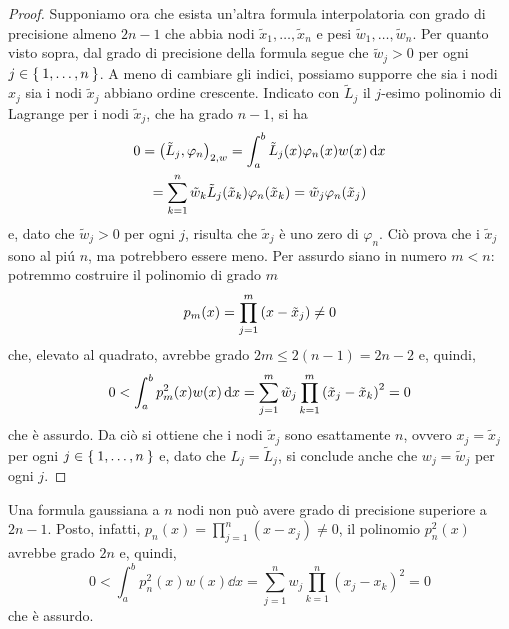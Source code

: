 \begin{proof}
		Supponiamo ora che esista un'altra formula interpolatoria con grado di precisione almeno \(2 n - 1\) che abbia nodi \(\tilde{x}_1, \dots, \tilde{x}_n\) e pesi \(\tilde{w}_1, \dots, \tilde{w}_n\). Per quanto visto sopra, dal grado di precisione della formula segue che \(\tilde{w}_j > 0\) per ogni \(j \in \Set{1, \dots, n}\). A meno di cambiare gli indici, possiamo supporre che sia i nodi \(x_j\) sia i nodi \(\tilde{x}_j\) abbiano ordine crescente. Indicato con \(\tilde{L}_j\) il \(j\)-esimo polinomio di Lagrange per i nodi \(\tilde{x}_j\), che ha grado \(n - 1\), si ha
		\begin{multline*}
				0 = \qty(\tilde{L}_j, \varphi_n)_{2, w} = \int_a^b \tilde{L}_j (x) \varphi_n (x) w (x) \dd{x} \\
				= \sum_{k = 1}^n \tilde{w}_k \tilde{L}_j (\tilde{x}_k) \varphi_n (\tilde{x}_k) = \tilde{w}_j \varphi_n (\tilde{x}_j)
		\end{multline*}
		e, dato che \(\tilde{w}_j > 0\) per ogni \(j\), risulta che \(\tilde{x}_j\) è uno zero di \(\varphi_n\). Ciò prova che i \(\tilde{x}_j\) sono al piú \(n\), ma potrebbero essere meno. Per assurdo siano in numero \(m < n\): potremmo costruire il polinomio di grado \(m\)
		\begin{equation*}
			p_m (x) = \prod_{j = 1}^m \qty(x - \tilde{x}_j) \ne 0
		\end{equation*}
		che, elevato al quadrato, avrebbe grado \(2 m \le 2 (n - 1) = 2 n - 2\) e, quindi,
		\begin{equation*}
			0 < \int_a^b p_m^2 (x) w (x) \dd{x} = \sum_{j = 1}^m \tilde{w}_j \prod_{k = 1}^m \qty(\tilde{x}_j - \tilde{x}_k)^2 = 0
		\end{equation*}
		che è assurdo. Da ciò si ottiene che i nodi \(\tilde{x}_j\) sono esattamente \(n\), ovvero \(x_j = \tilde{x}_j\) per ogni \(j \in \Set{1, \dots, n}\) e, dato che \(L_j = \tilde{L}_j\), si conclude anche che \(w_j = \tilde{w}_j\) per ogni \(j\).
	\end{proof}

	\begin{osservazione}
		Una formula gaussiana a \(n\) nodi non può avere grado di precisione superiore a \(2 n - 1\). Posto, infatti, \(p_n (x) = \prod_{j = 1}^n (x - x_j) \ne 0\), il polinomio \(p_n^2 (x)\) avrebbe grado \(2 n\) e, quindi,
		\begin{equation*}
			0 < \int_a^b p_n^2 (x) w (x) \dd{x} = \sum_{j = 1}^n w_j \prod_{k = 1}^n (x_j - x_k)^2 = 0
		\end{equation*}
		che è assurdo.
	\end{osservazione}

